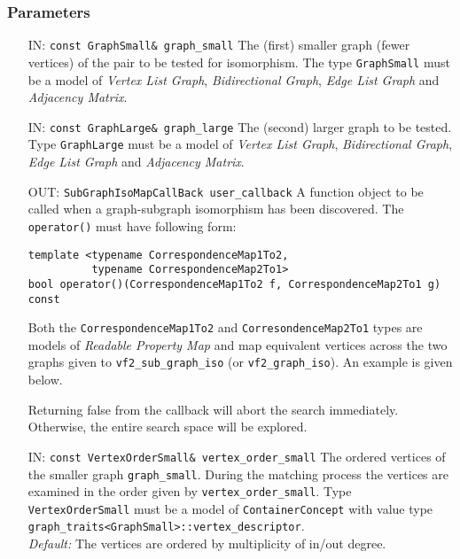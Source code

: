 \documentclass[12pt]{article}
\begin{document}
\subsubsection*{Parameters}

\begin{itemize}

\item[IN:] \verb+const GraphSmall& graph_small+ The (first) smaller graph (fewer vertices)
of the pair to be tested for isomorphism. The type \verb+GraphSmall+ must be a
model of {\em Vertex List Graph}, {\em Bidirectional Graph}, {\em Edge List
Graph} and {\em Adjacency Matrix}.


\item[IN:] \verb+const GraphLarge& graph_large+ The (second) larger graph to be tested.
Type \verb+GraphLarge+ must be a model of 
{\em Vertex List Graph}, {\em Bidirectional Graph}, {\em Edge List Graph} and
{\em Adjacency Matrix}.

\item[OUT:] \verb+SubGraphIsoMapCallBack user_callback+ A function object to be
called when a graph-subgraph isomorphism has been discovered. The
\verb+operator()+ must have following form:
\begin{lstlisting}
template <typename CorrespondenceMap1To2,
          typename CorrespondenceMap2To1>
bool operator()(CorrespondenceMap1To2 f, CorrespondenceMap2To1 g) const
\end{lstlisting}

Both the \verb+CorrespondenceMap1To2+ and \verb+CorresondenceMap2To1+ types
are models of {\em Readable Property Map} and map equivalent vertices across
the two graphs given to \verb+vf2_sub_graph_iso+ (or \verb+vf2_graph_iso+). An
example is given below. 

Returning false from the callback will abort the search immediately. Otherwise,
the entire search space will be explored.


\item[IN:] \verb+const VertexOrderSmall& vertex_order_small+ The ordered
vertices of the smaller graph \verb+graph_small+. During the matching process the
vertices are examined in the order given by \verb+vertex_order_small+. Type
\verb+VertexOrderSmall+ must be a model of \verb+ContainerConcept+ with value
type \verb+graph_traits<GraphSmall>::vertex_descriptor+.
\\
{\em Default:} The vertices are ordered by multiplicity of in/out degree.

\end{itemize}
\end{document}
